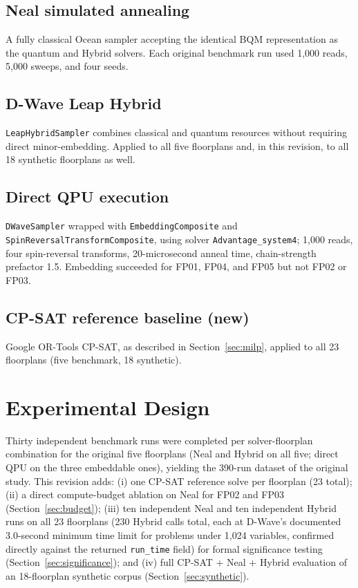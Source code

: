 \documentclass[11pt]{article}
\begin{document}
\subsection{Neal simulated annealing}
A fully classical Ocean sampler accepting the identical BQM representation as the quantum and Hybrid solvers. Each original benchmark run used 1,000 reads, 5,000 sweeps, and four seeds.

\subsection{D-Wave Leap Hybrid}
\texttt{LeapHybridSampler} combines classical and quantum resources without requiring direct minor-embedding. Applied to all five floorplans and, in this revision, to all 18 synthetic floorplans as well.

\subsection{Direct QPU execution}
\texttt{DWaveSampler} wrapped with \texttt{EmbeddingComposite} and \texttt{SpinReversalTransformComposite}, using solver \texttt{Advantage\_system4}; 1,000 reads, four spin-reversal transforms, 20-microsecond anneal time, chain-strength prefactor 1.5. Embedding succeeded for FP01, FP04, and FP05 but not FP02 or FP03.

\subsection{CP-SAT reference baseline (new)}
Google OR-Tools CP-SAT, as described in Section~\ref{sec:milp}, applied to all 23 floorplans (five benchmark, 18 synthetic).

\section{Experimental Design}

Thirty independent benchmark runs were completed per solver-floorplan combination for the original five floorplans (Neal and Hybrid on all five; direct QPU on the three embeddable ones), yielding the 390-run dataset of the original study. This revision adds: (i) one CP-SAT reference solve per floorplan (23 total); (ii) a direct compute-budget ablation on Neal for FP02 and FP03 (Section~\ref{sec:budget}); (iii) ten independent Neal and ten independent Hybrid runs on all 23 floorplans (230 Hybrid calls total, each at D-Wave's documented 3.0-second minimum time limit for problems under 1,024 variables, confirmed directly against the returned \texttt{run\_time} field) for formal significance testing (Section~\ref{sec:significance}); and (iv) full CP-SAT + Neal + Hybrid evaluation of an 18-floorplan synthetic corpus (Section~\ref{sec:synthetic}).
\end{document}
